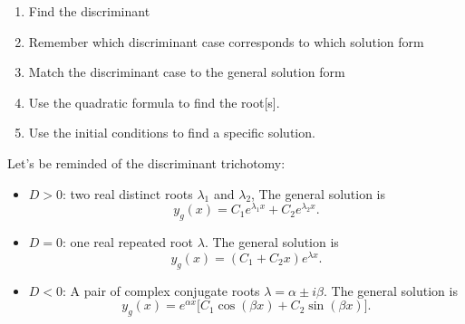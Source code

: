 \documentclass[a4paper,12pt]{article} %
\begin{document}
\begin{enumerate}
	\item Find the discriminant
	\item Remember which discriminant case corresponds to which solution form
	\item Match the discriminant case to the general solution form
	\item Use the quadratic formula to find the root[s].
	\item Use the initial conditions to find a specific solution.
\end{enumerate}
Let's be reminded of the discriminant trichotomy:\\
\begin{itemize}
	\item $D>0$: two real distinct roots $\lambda_1$ and $\lambda_2$, The general solution is
$$
y_g(x)=C_1 e^{\lambda_1 x}+C_2 e^{\lambda_2 x}.
$$
\item $D=0$: one real repeated root $\lambda$. The general solution is
$$
y_g(x)=\left(C_1+C_2 x\right) e^{\lambda x}.
$$
\item $D<0$: A pair of complex conjugate roots $\lambda=\alpha \pm i \beta$. The general solution is
$$
y_g(x) =e^{\alpha x}\bigg[C_1\cos (\beta x)+C_2\sin (\beta x)\bigg].
$$


\end{itemize}
\end{document}
